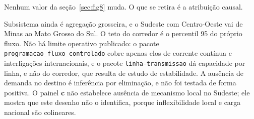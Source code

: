  Nenhum valor da seção~\ref{sec:fig8} muda.
O que se retira é a atribuição causal.

\begin{objecao}
Subsistema ainda é agregação grosseira, e o Sudeste com Centro-Oeste vai de
Minas ao Mato Grosso do Sul. O teto do corredor é o percentil 95 do próprio
fluxo. Não há limite operativo publicado: o pacote
\texttt{programacao\_\allowbreak fluxo\_\allowbreak controlado} cobre apenas
elos de corrente contínua e interligações internacionais, e o pacote
\texttt{linha-\allowbreak transmissao} dá capacidade por linha, e não do
corredor, que resulta de estudo de estabilidade. A ausência de demanda no destino é inferência
por eliminação, e não foi testada de forma positiva. O painel \textbf{c} não
estabelece ausência de mecanismo local no Sudeste; ele mostra que este desenho
não o identifica, porque inflexibilidade local e carga nacional são colineares.
\end{objecao}
